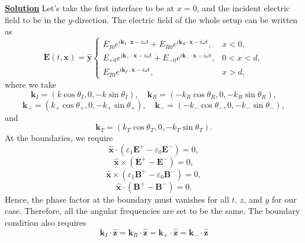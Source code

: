 \noindent \underline{\textbf{Solution}} Let's take the first interface to be at $x=0$, and the incident electric field to be in the $y$-direction.
The electric field of the whole setup can be written as
\begin{equation}
    \mathbf{E}(t, \mathbf{x}) = \hat{\mathbf{y}}\begin{cases}
        E_{I0}e^{i\mathbf{k}_I\cdot \mathbf{x}-i\omega t } + E_{R0}e^{i\mathbf{k}_R\cdot \mathbf{x}-i\omega t },&x<0,\\
        E_{+0}e^{i\mathbf{k}_+\cdot \mathbf{x}-i\omega t } + E_{-0}e^{i\mathbf{k}_-\cdot \mathbf{x}-i\omega t }, &0<x<d,\\
        E_{T0}e^{i\mathbf{k}_T\cdot \mathbf{x}-i\omega t },&   x>d,
    \end{cases}
\end{equation}
where  we take 
\begin{equation}
    \mathbf{k}_I = (k\cos\theta_I,0,-k\sin\theta_I), \quad \mathbf{k}_R=(-k_R\cos\theta_R, 0, -k_R\sin\theta_R),
\end{equation}
\begin{equation}
    \mathbf{k}_+ = (k_+\cos\theta_+,0,-k_+\sin\theta_+), \quad \mathbf{k}_-=(-k_-\cos\theta_-, 0, -k_-\sin\theta_-),
\end{equation}
and
\begin{equation}
    \mathbf{k}_T = (k_T\cos\theta_T,0,-k_T\sin\theta_T).
\end{equation}
At the boundaries, we require
\begin{equation}
    \hat{\mathbf{{x}}}\cdot(\varepsilon_1\mathbf{E}^+ - \varepsilon_0\mathbf{E}^-)=0, 
    \label{eq:E//}
\end{equation}
\begin{equation}
    \hat{\mathbf{{x}}}\times(\mathbf{E}^+ - \mathbf{E}^-)=0, 
    \label{eq:Ep}
\end{equation}
\begin{equation}
    \hat{\mathbf{{x}}}\times(\varepsilon_1\mathbf{B}^+ - \varepsilon_0\mathbf{B}^-)=0,
    \label{eq:Bp}
\end{equation}
\begin{equation}
    \hat{\mathbf{{x}}}\cdot(\mathbf{B}^+ - \mathbf{B}^-)=0.
    \label{eq:B//}
\end{equation}
Hence, the phase factor at the boundary must vanishes for all $t$, $z$, and $y$ for our case. Therefore, all the angular frequencies are set to be the same. The boundary condition also requires
\begin{equation}
    \mathbf{k}_I\cdot \hat{\mathbf{z}} = \mathbf{k}_R\cdot \hat{\mathbf{z}} = \mathbf{k}_+\cdot \hat{\mathbf{z}}= \mathbf{k}_-\cdot \hat{\mathbf{z}}
    \label{eq:con1}
\end{equation}
